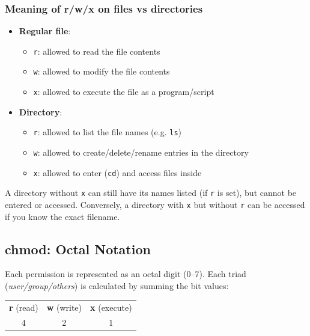 \subsubsection*{Meaning of r/w/x on files vs directories}
\begin{itemize}
    \item \textbf{Regular file}:
    \begin{itemize}
        \item \texttt{r}: allowed to read the file contents
        \item \texttt{w}: allowed to modify the file contents
        \item \texttt{x}: allowed to execute the file as a program/script
    \end{itemize}
    \item \textbf{Directory}:
    \begin{itemize}
        \item \texttt{r}: allowed to list the file names (e.g. \texttt{ls})
        \item \texttt{w}: allowed to create/delete/rename entries in the directory
        \item \texttt{x}: allowed to enter (\texttt{cd}) and access files inside
    \end{itemize}
\end{itemize}

\begin{warningbox}
A directory without \texttt{x} can still have its names listed (if \texttt{r}
is set), but cannot be entered or accessed. Conversely, a directory with
\texttt{x} but without \texttt{r} can be accessed if you know the exact
filename.
\end{warningbox}

\subsection{chmod: Octal Notation}
\label{subsec:chmod-octal}

Each permission is represented as an octal digit (0--7). Each triad
(\textit{user/group/others}) is calculated by summing the bit values:

\begin{center}
\begin{tabular}{ccc}
    \textbf{r} (read) & \textbf{w} (write) & \textbf{x} (execute) \\
    4                 & 2                  & 1                    \\
\end{tabular}
\end{center}


